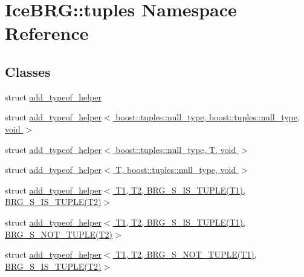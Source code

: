 \hypertarget{namespaceIceBRG_1_1tuples}{}\section{Ice\+B\+R\+G\+:\+:tuples Namespace Reference}
\label{namespaceIceBRG_1_1tuples}
\subsection*{Classes}
\begin{DoxyCompactItemize}
\item 
struct \hyperlink{namespaceIceBRG_1_1tuples_structIceBRG_1_1tuples_1_1add__typeof__helper}{add\+\_\+typeof\+\_\+helper}
\item 
struct \hyperlink{namespaceIceBRG_1_1tuples_structIceBRG_1_1tuples_1_1add__typeof__helper_3_01boost_1_1tuples_1_1null__type_00_01boost_1_1tuc2970434d93561fa1e1db195cb99b491}{add\+\_\+typeof\+\_\+helper$<$ boost\+::tuples\+::null\+\_\+type, boost\+::tuples\+::null\+\_\+type, void $>$}
\item 
struct \hyperlink{namespaceIceBRG_1_1tuples_structIceBRG_1_1tuples_1_1add__typeof__helper_3_01boost_1_1tuples_1_1null__type_00_01T_00_01void_01_4}{add\+\_\+typeof\+\_\+helper$<$ boost\+::tuples\+::null\+\_\+type, T, void $>$}
\item 
struct \hyperlink{namespaceIceBRG_1_1tuples_structIceBRG_1_1tuples_1_1add__typeof__helper_3_01T_00_01boost_1_1tuples_1_1null__type_00_01void_01_4}{add\+\_\+typeof\+\_\+helper$<$ T, boost\+::tuples\+::null\+\_\+type, void $>$}
\item 
struct \hyperlink{namespaceIceBRG_1_1tuples_structIceBRG_1_1tuples_1_1add__typeof__helper_3_01T1_00_01T2_00_01BRG__S__IS__TUPLE_07T1_08_00_01BRG__S__IS__TUPLE_07T2_08_4}{add\+\_\+typeof\+\_\+helper$<$ T1, T2, B\+R\+G\+\_\+\+S\+\_\+\+I\+S\+\_\+\+T\+U\+P\+L\+E(\+T1), B\+R\+G\+\_\+\+S\+\_\+\+I\+S\+\_\+\+T\+U\+P\+L\+E(\+T2)$>$}
\item 
struct \hyperlink{namespaceIceBRG_1_1tuples_structIceBRG_1_1tuples_1_1add__typeof__helper_3_01T1_00_01T2_00_01BRG__S__IS__TUPLE_07T1_08_00_01BRG__S__NOT__TUPLE_07T2_08_4}{add\+\_\+typeof\+\_\+helper$<$ T1, T2, B\+R\+G\+\_\+\+S\+\_\+\+I\+S\+\_\+\+T\+U\+P\+L\+E(\+T1), B\+R\+G\+\_\+\+S\+\_\+\+N\+O\+T\+\_\+\+T\+U\+P\+L\+E(\+T2)$>$}
\item 
struct \hyperlink{namespaceIceBRG_1_1tuples_structIceBRG_1_1tuples_1_1add__typeof__helper_3_01T1_00_01T2_00_01BRG__S__NOT__TUPLE_07T1_08_00_01BRG__S__IS__TUPLE_07T2_08_4}{add\+\_\+typeof\+\_\+helper$<$ T1, T2, B\+R\+G\+\_\+\+S\+\_\+\+N\+O\+T\+\_\+\+T\+U\+P\+L\+E(\+T1), B\+R\+G\+\_\+\+S\+\_\+\+I\+S\+\_\+\+T\+U\+P\+L\+E(\+T2)$>$}

\end{DoxyCompactItemize}
